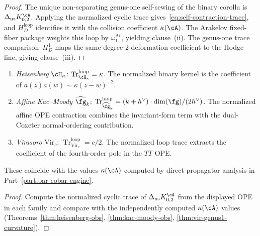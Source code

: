 \begin{proof}
The unique non-separating genus-one self-sewing of the binary corolla
is $\Delta_{\mathrm{ns}}K_{0,2}^{\cA}$.  Applying the normalized cyclic
trace gives~\eqref{eq:self-contraction-trace}, and
$H_D^{\mathrm{loop}}$ identifies it with the collision coefficient
$\kappa(\cA)$.  The Arakelov fixed-fiber package weights this loop by
$\omega_1^{\mathrm{Ar}}$, yielding clause~\textup{(ii)}.  The
genus-one trace comparison~$H_D^1$ maps the same degree-$2$
deformation coefficient to the Hodge line, giving clause~\textup{(iii)}.
\end{proof}

\begin{corollary}[Anomaly = trace for standard families;
\ClaimStatusConditional]\label{cor:anomaly-trace-standard}
\begin{enumerate}[label=\textup{(\alph*)}]
\item \emph{Heisenberg} $\cH_\kappa$:
 $\operatorname{Tr}^{\mathrm{loop}}_{\cH_\kappa} = \kappa$.
 The normalized binary kernel is the coefficient of
 $a(z)a(w)\sim\kappa(z-w)^{-2}$.
\item \emph{Affine Kac--Moody} $\widehat{\fg}_k$:
 $\operatorname{Tr}^{\mathrm{loop}}_{\widehat{\fg}_k}
 = (k + h^\vee) \cdot \dim(\fg) / (2h^\vee)$.
 The normalized affine OPE contraction combines the invariant-form
 term with the dual-Coxeter normal-ordering contribution.
\item \emph{Virasoro} $\mathrm{Vir}_c$:
 $\operatorname{Tr}^{\mathrm{loop}}_{\mathrm{Vir}_c} = c/2$.
 The normalized loop trace extracts the coefficient of the
 fourth-order pole in the $TT$ OPE.
\end{enumerate}
These coincide with the values $\kappa(\cA)$ computed by direct
propagator analysis in Part~\ref{part:bar-cobar-engine}.
\end{corollary}

\begin{proof}
Compute the normalized cyclic trace of
$\Delta_{\mathrm{ns}}K_{0,2}^{\cA}$ from the displayed OPE in each
family and compare with the independently computed $\kappa(\cA)$ values
(Theorems~\ref{thm:heisenberg-obs},
\ref{thm:kac-moody-obs}, \ref{thm:vir-genus1-curvature}).
\end{proof}

